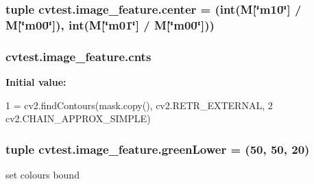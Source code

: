 \subsubsection[{\texorpdfstring{center}{center}}]{\setlength{\rightskip}{0pt plus 5cm}tuple cvtest.\+image\+\_\+feature.\+center = (int({\bf M}\mbox{[}\char`\"{}m10\char`\"{}\mbox{]} / M\mbox{[}\char`\"{}m00\char`\"{}\mbox{]}), int({\bf M}\mbox{[}\char`\"{}m01\char`\"{}\mbox{]} / M\mbox{[}\char`\"{}m00\char`\"{}\mbox{]}))\hspace{0.3cm}{\ttfamily [static]}}\hypertarget{classcvtest_1_1image__feature_a2ae34db381b06abd2545e21c6f7cc2b0}{}\label{classcvtest_1_1image__feature_a2ae34db381b06abd2545e21c6f7cc2b0}
\subsubsection[{\texorpdfstring{cnts}{cnts}}]{\setlength{\rightskip}{0pt plus 5cm}cvtest.\+image\+\_\+feature.\+cnts\hspace{0.3cm}{\ttfamily [static]}}\hypertarget{classcvtest_1_1image__feature_aa27ede44db1c89ea7519de78a7b762ac}{}\label{classcvtest_1_1image__feature_aa27ede44db1c89ea7519de78a7b762ac}
{\bfseries Initial value\+:}
\begin{DoxyCode}
1 = cv2.findContours(mask.copy(), cv2.RETR\_EXTERNAL,
2                                 cv2.CHAIN\_APPROX\_SIMPLE)
\end{DoxyCode}
\subsubsection[{\texorpdfstring{green\+Lower}{greenLower}}]{\setlength{\rightskip}{0pt plus 5cm}tuple cvtest.\+image\+\_\+feature.\+green\+Lower = (50, 50, 20)\hspace{0.3cm}{\ttfamily [static]}}\hypertarget{classcvtest_1_1image__feature_aa26cd5e97c9f095fcffe440718a19770}{}\label{classcvtest_1_1image__feature_aa26cd5e97c9f095fcffe440718a19770}


set colours bound 

